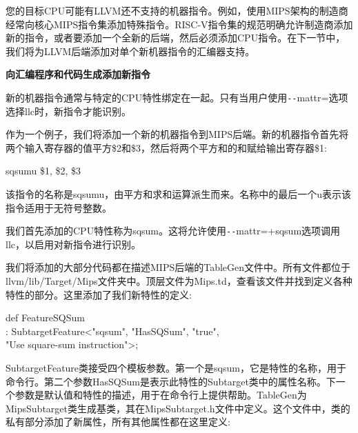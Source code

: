 您的目标CPU可能有LLVM还不支持的机器指令。例如，使用MIPS架构的制造商经常向核心MIPS指令集添加特殊指令。RISC-V指令集的规范明确允许制造商添加新的指令，或者要添加一个全新的后端，然后必须添加CPU指令。在下一节中，我们将为LLVM后端添加对单个新机器指令的汇编器支持。\par

\hspace*{\fill} \par %
\textbf{向汇编程序和代码生成添加新指令}

新的机器指令通常与特定的CPU特性绑定在一起。只有当用户使用\verb|--|mattr=选项选择llc时，新指令才能识别。\par

作为一个例子，我们将添加一个新的机器指令到MIPS后端。新的机器指令首先将两个输入寄存器的值平方\$2和\$3，然后将两个平方和的和赋给输出寄存器\$1:\par

\begin{tcolorbox}[colback=white,colframe=black]
sqsumu \$1, \$2, \$3
\end{tcolorbox}

该指令的名称是sqsumu，由平方和求和运算派生而来。名称中的最后一个u表示该指令适用于无符号整数。\par

我们首先添加的CPU特性称为sqsum。这将允许使用\verb|--|mattr=+sqsum选项调用llc，以启用对新指令进行识别。\par

我们将添加的大部分代码都在描述MIPS后端的TableGen文件中。所有文件都位于llvm/lib/\allowbreak Target/Mips文件夹中。顶层文件为Mips.td，查看该文件并找到定义各种特性的部分。这里添加了我们新特性的定义:\par

\begin{tcolorbox}[colback=white,colframe=black]
def FeatureSQSum \\
\hspace*{1cm}: SubtargetFeature<"sqsum", "HasSQSum", "true", \\
\hspace*{6cm}"Use square-sum instruction">;
\end{tcolorbox}

SubtargetFeature类接受四个模板参数。第一个是sqsum，它是特性的名称，用于命令行。第二个参数HasSQSum是表示此特性的Subtarget类中的属性名称。下一个参数是默认值和特性的描述，用于在命令行上提供帮助。TableGen为MipsSubtarget类生成基类，其在MipsSubtarget.h文件中定义。这个文件中，类的私有部分添加了新属性，所有其他属性都在这里定义:\par


